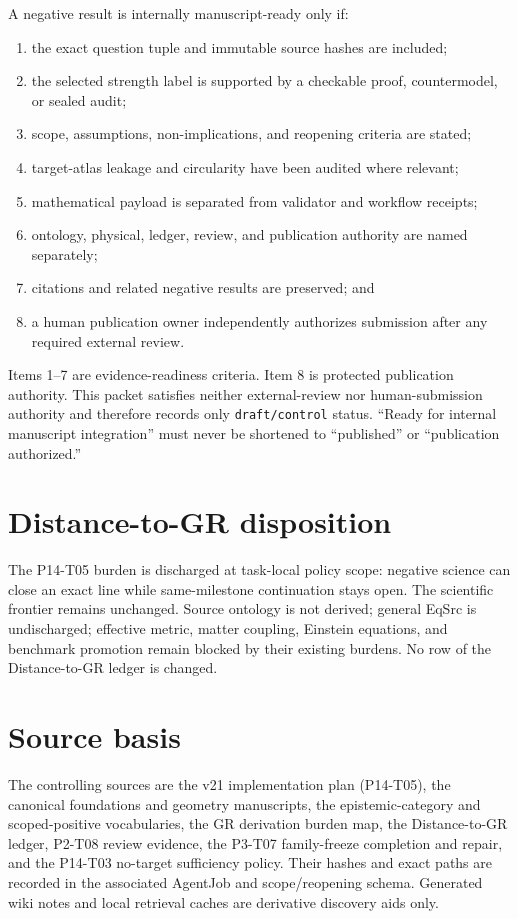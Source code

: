 \documentclass[11pt]{article}
\begin{document}
A negative result is internally manuscript-ready only if:
\begin{enumerate}
  \item the exact question tuple and immutable source hashes are included;
  \item the selected strength label is supported by a checkable proof,
  countermodel, or sealed audit;
  \item scope, assumptions, non-implications, and reopening criteria are stated;
  \item target-atlas leakage and circularity have been audited where relevant;
  \item mathematical payload is separated from validator and workflow receipts;
  \item ontology, physical, ledger, review, and publication authority are named
  separately;
  \item citations and related negative results are preserved; and
  \item a human publication owner independently authorizes submission after
  any required external review.
\end{enumerate}

Items 1--7 are evidence-readiness criteria.  Item 8 is protected publication
authority.  This packet satisfies neither external-review nor human-submission
authority and therefore records only \texttt{draft/control} status.  ``Ready
for internal manuscript integration'' must never be shortened to ``published''
or ``publication authorized.''

\section{Distance-to-GR disposition}

The P14-T05 burden is discharged at task-local policy scope: negative science
can close an exact line while same-milestone continuation stays open.  The
scientific frontier remains unchanged.  Source ontology is not derived;
general EqSrc is undischarged; effective metric, matter coupling, Einstein
equations, and benchmark promotion remain blocked by their existing burdens.
No row of the Distance-to-GR ledger is changed.

\section{Source basis}

The controlling sources are the v21 implementation plan (P14-T05), the
canonical foundations and geometry manuscripts, the epistemic-category and
scoped-positive vocabularies, the GR derivation burden map, the Distance-to-GR
ledger, P2-T08 review evidence, the P3-T07 family-freeze completion and repair,
and the P14-T03 no-target sufficiency policy.  Their hashes and exact paths are
recorded in the associated AgentJob and scope/reopening schema.  Generated
wiki notes and local retrieval caches are derivative discovery aids only.
\end{document}
